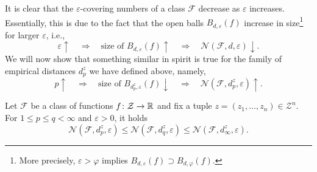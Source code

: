 It is clear that the $\varepsilon$-covering numbers of a class $\mathcal{F}$ decrease as $\varepsilon$ increases. Essentially, this is due to the fact that the open balls $B_{d, \varepsilon}(f)$ increase in size\footnote{More precisely, $\varepsilon > \varphi$ implies $B_{d, \varepsilon}(f) \supset B_{d, \varphi}(f)$.} for larger $\varepsilon$, i.e.,
\[
    \varepsilon \uparrow \quad \Rightarrow \quad \text{size of } B_{d, \varepsilon}(f) \uparrow \quad \Rightarrow \quad \mathcal{N}(\mathcal{F}, d, \varepsilon) \downarrow.
\]
We will now show that something similar in spirit is true for the family of empirical distances $d_p^z$ we have defined above, namely,
\[
    p \uparrow \quad \Rightarrow \quad \text{size of } B_{d_p^z, \varepsilon}(f) \downarrow \quad \Rightarrow \quad \mathcal{N}(\mathcal{F}, d_p^z, \varepsilon) \uparrow.
\]

\begin{proposition}
Let $\mathcal{F}$ be a class of functions $f \colon \mathcal{Z} \to \mathbb{R}$ and fix a tuple $z = (z_1, \dots, z_n) \in \mathcal{Z}^n$. For $1 \leq p \leq q < \infty$ and $\varepsilon > 0$, it holds
\[
    \mathcal{N}(\mathcal{F}, d_p^z, \varepsilon) \leq \mathcal{N}(\mathcal{F}, d_q^z, \varepsilon) \leq \mathcal{N}(\mathcal{F}, d_{\infty}^z, \varepsilon).
\]
\end{proposition}

